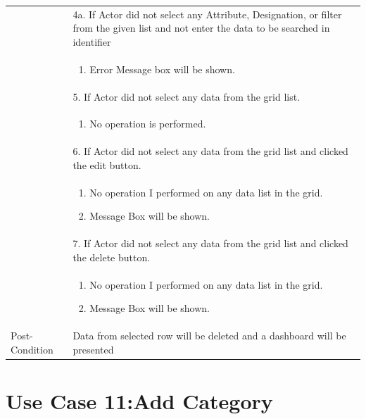 \documentclass[12pt,a4paper]{article}
\begin{document}
\begin{longtable}{| p{3cm}|p{12cm}|}
& 4a. If Actor did not select any Attribute, Designation, or filter from the given list and not enter the data to be searched in identifier \\
& \begin{enumerate}
		\item Error Message box will be shown.
	\end{enumerate}
\\  
& 5. If Actor did not select any data from the grid list.  \\
& \begin{enumerate}
		\item No operation is performed.
	\end{enumerate}
	\\
& 6. If Actor did not select any data from the grid list and clicked the edit button.\\
& \begin{enumerate}
		\item No operation I performed on any data list in the grid.
            \item Message Box will be shown.
	\end{enumerate}
\\
&7. If Actor did not select any data from the grid list and clicked the delete button.\\
 	&\begin{enumerate}
			\item No operation I performed on any data list in the grid.
            \item Message Box will be shown.
	\end{enumerate}
\\ \hline 


Post-Condition &  Data from selected row will be deleted and a dashboard will be presented  \\ \hline


\end{longtable}




\section*{Use Case 11:Add Category}
\end{document}
